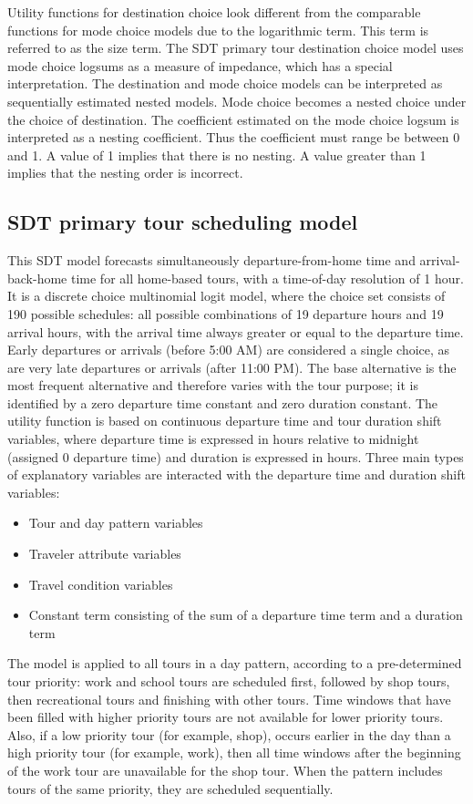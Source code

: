 Utility functions for destination choice look different from the comparable functions for mode choice models due to the logarithmic term. This term is referred to as the size term. The SDT primary tour destination choice model uses mode choice logsums as a measure of impedance, which has a special interpretation. The destination and mode choice models can be interpreted as sequentially estimated nested models. Mode choice becomes a nested choice under the choice of destination. The coefficient estimated on the mode choice logsum is interpreted as a nesting coefficient. Thus the coefficient must range be between 0 and 1. A value of 1 implies that there is no nesting. A value greater than 1 implies that the nesting order is incorrect.

\subsection{SDT primary tour scheduling model}\label{sec:sdt-primary-tour-scheduling}
This SDT model forecasts simultaneously departure-from-home time and arrival-back-home time for all home-based tours, with a time-of-day resolution of 1 hour. It is a discrete choice multinomial logit model, where the choice set consists of 190 possible schedules:  all possible combinations of 19 departure hours and 19 arrival hours, with the arrival time always greater or equal to the departure time. Early departures or arrivals (before 5:00 AM) are considered a single choice, as are very late departures or arrivals (after 11:00 PM). The base alternative is the most frequent alternative and therefore varies with the tour purpose; it is identified by a zero departure time constant and zero duration constant. The utility function is based on continuous departure time and tour duration shift variables, where departure time is expressed in hours relative to midnight (assigned 0 departure time) and duration is expressed in hours. Three main types of explanatory variables are interacted with the departure time and duration shift variables: 
\begin{itemize}
\item Tour and day pattern variables
\item Traveler attribute variables
\item Travel condition variables
\item Constant term consisting of the sum of a departure time term and a duration term
\end{itemize}

The model is applied to all tours in a day pattern, according to a pre-determined tour priority:  work and school tours are scheduled first, followed by shop tours, then recreational tours and finishing with other tours. Time windows that have been filled with higher priority tours are not available for lower priority tours. Also, if a low priority tour (for example, shop), occurs earlier in the day than a high priority tour (for example, work), then all time windows after the beginning of the work tour are unavailable for the shop tour. When the pattern includes tours of the same priority, they are scheduled sequentially.

